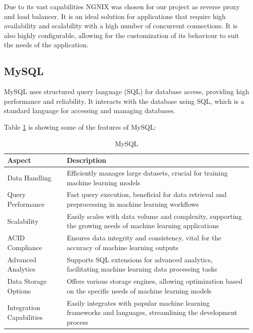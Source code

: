 Due to its vast capabilities NGNIX was chosen for our project as reverse proxy and load balancer. It is an ideal solution for applications that require high availability and scalability with a 
high number of concurrent connections. It is also highly configurable, allowing for the customization of its behaviour to suit the needs of the application.

\subsection{MySQL}
MySQL uses structured query language (SQL) for database access, providing high performance and reliability. It interacts with the database using SQL, which
is a standard language for accessing and managing databases. 


Table \ref{tab:mysql} is showing some of the features of MySQL\cite{mysql}:

\begin{table}[H]
    \centering
    \begin{tabularx}{\textwidth}{|l|X|}
        \hline
        \textbf{Aspect}          & \textbf{Description}                                                                                                   \\
        \hline
        Data Handling            & Efficiently manages large datasets, crucial for training machine learning models                                       \\
        \hline
        Query Performance        & Fast query execution, beneficial for data retrieval and preprocessing in machine learning workflows                    \\
        \hline
        Scalability              & Easily scales with data volume and complexity, supporting the growing needs of machine learning applications           \\
        \hline
        ACID Compliance          & Ensures data integrity and consistency, vital for the accuracy of machine learning outputs                             \\
        \hline
        Advanced Analytics       & Supports SQL extensions for advanced analytics, facilitating machine learning data processing tasks                    \\
        \hline
        Data Storage Options     & Offers various storage engines, allowing optimization based on the specific needs of machine learning models           \\
        \hline
        Integration Capabilities & Easily integrates with popular machine learning frameworks and languages, streamlining the development process         \\
        \hline
    \end{tabularx}
    \caption{MySQL}
    \label{tab:mysql}
    
\end{table}

